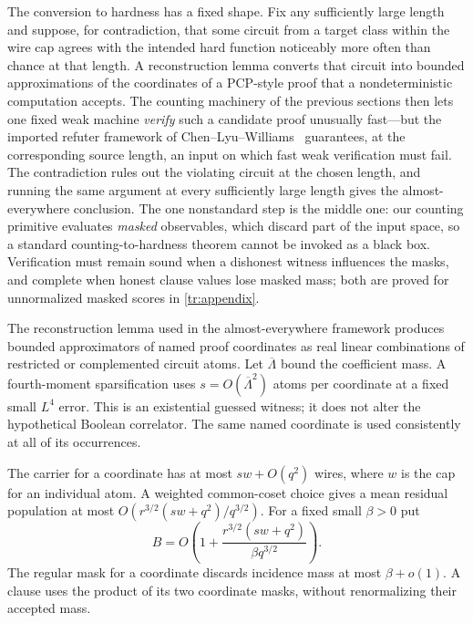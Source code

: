\documentclass[11pt,letterpaper]{article}
\theoremstyle{definition}
\theoremstyle{remark}
\begin{document}
The conversion to hardness has a fixed shape. Fix any sufficiently
large length and suppose, for contradiction, that some circuit from a
target class within the wire cap agrees with the intended hard
function noticeably more often than chance at that length. A
reconstruction lemma converts that circuit into bounded approximations
of the coordinates of a PCP-style proof that a nondeterministic
computation accepts. The counting machinery of the previous sections
then lets one fixed weak machine \emph{verify} such a candidate proof
unusually fast---but the imported refuter framework of
Chen--Lyu--Williams~\cite{CLW} guarantees, at the corresponding source
length, an input on which fast weak verification must fail. The
contradiction rules out the violating circuit at the chosen length,
and running the same argument at every sufficiently large length gives
the almost-everywhere conclusion. The one nonstandard step is the
middle one: our counting primitive evaluates \emph{masked}
observables, which discard part of the input space, so a standard
counting-to-hardness theorem cannot be invoked as a black box.
Verification must remain sound when a dishonest witness influences
the masks, and complete when honest clause values lose masked mass;
both are proved for unnormalized masked scores in \cref{tr:appendix}.

The reconstruction lemma used in the almost-everywhere framework
produces bounded approximators of named proof coordinates as real
linear combinations of restricted or complemented circuit atoms.
Let $\overline\Lambda$ bound the coefficient mass. A fourth-moment
sparsification uses $s=O(\overline\Lambda^2)$ atoms per coordinate at a
fixed small $L^4$ error. This is an existential guessed witness; it does
not alter the hypothetical Boolean correlator. The same named
coordinate is used consistently at all of its occurrences.

The carrier for a coordinate has at most $s w+O(q^2)$ wires, where
$w$ is the cap for an individual atom. A weighted common-coset choice
gives a mean residual population at most
$O(r^{3/2}(s w+q^2)/q^{3/2})$. For a fixed small $\beta>0$ put
\begin{equation}
B=O\!\left(1+\frac{r^{3/2}(s w+q^2)}{\beta q^{3/2}}\right).
\label{eq:carrier-main}
\end{equation}
The regular mask for a coordinate discards incidence mass at most
$\beta+o(1)$. A clause uses the product of its two coordinate masks,
without renormalizing their accepted mass.
\end{document}
